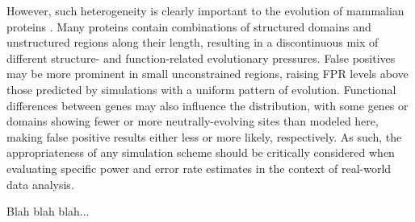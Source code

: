 However, such heterogeneity is clearly important to the evolution of
mammalian proteins \citep{Fay2003}. Many proteins contain combinations
of structured domains and unstructured regions along their length,
resulting in a discontinuous mix of different structure- and
function-related evolutionary pressures. False positives may be more
prominent in small unconstrained regions, raising FPR levels above
those predicted by simulations with a uniform pattern of
evolution. Functional differences between genes may also influence the
\omg distribution, with some genes or domains showing fewer or more
neutrally-evolving sites than modeled here, making false positive
results either less or more likely, respectively. As such, the
appropriateness of any simulation scheme should be critically
considered when evaluating specific power and error rate estimates in
the context of real-world data analysis.

Blah blah blah...



